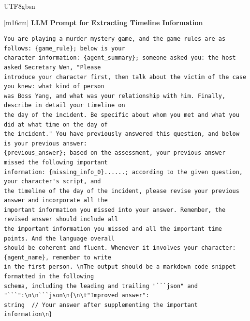 \documentclass[11pt]{article}
\begin{document}
{\begin{CJK}{UTF8}{gbsn}
\begin{table}[ht!]
\begin{minipage}[t]{\linewidth}
\begin{tabular}{|m{16cm}|}
\hline
{}  {\textbf{LLM Prompt for Extracting Timeline Information}} \\
\begin{minipage}[t]{\linewidth}
\small\begin{verbatim}
You are playing a murder mystery game, and the game rules are as follows: {game_rule}; below is your 
character information: {agent_summary}; someone asked you: the host asked Secretary Wen, "Please 
introduce your character first, then talk about the victim of the case you knew: what kind of person
was Boss Yang, and what was your relationship with him. Finally, describe in detail your timeline on
the day of the incident. Be specific about whom you met and what you did at what time on the day of
the incident." You have previously answered this question, and below is your previous answer: 
{previous_answer}; based on the assessment, your previous answer missed the following important
information: {missing_info_0}......; according to the given question, your character's script, and
the timeline of the day of the incident, please revise your previous answer and incorporate all the
important information you missed into your answer. Remember, the revised answer should include all 
the important information you missed and all the important time points. And the language overall 
should be coherent and fluent. Whenever it involves your character: {agent_name}, remember to write
in the first person. \nThe output should be a markdown code snippet formatted in the following 
schema, including the leading and trailing "```json" and "```":\n\n```json\n{\n\t"Improved answer":
string  // Your answer after supplementing the important information\n}
\end{verbatim}
\end{minipage} \\
\hline


\end{tabular}
\end{minipage}
\end{table}
\end{CJK}}
\end{document}
